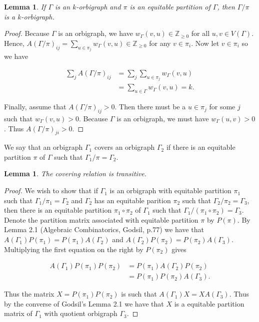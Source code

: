 \documentclass[12pt]{article}
\theoremstyle{plain}
\newtheorem{lemma}[theorem]{Lemma}
\theoremstyle{definition}
\theoremstyle{remark}
\begin{document}
    \begin{lemma}\label{lemma:EqPartitionQuotient}
      If $\Gamma$ is an $k$-orbigraph and $\pi$ is an equitable partition of $\Gamma$, then $\Gamma / \pi$ is a $k$-orbigraph.
    \end{lemma}
    \begin{proof}
      Because $\Gamma$ is an orbigraph, we have $w_\Gamma(v, u) \in \mathbb{Z}_{\ge 0}$ for all $u, v \in V(\Gamma)$. Hence, $A(\Gamma / \pi)_{ij} = \sum_{u \in \pi_j} w_\Gamma(v, u) \in \mathbb{Z}_{\ge 0}$ for any $v \in \pi_i$. Now let $v \in \pi_i$ so we have
      
      \begin{align*}
        \sum_j A(\Gamma / \pi)_{ij} &= \sum_j \sum_{u \in \pi_j} w_\Gamma(v, u) \\
        &= \sum_{u \in \Gamma} w_\Gamma(v, u) = k.
      \end{align*}

      Finally, assume that $A(\Gamma / \pi)_{ij} > 0$. Then there must be a $u \in \pi_j$ for some $j$ such that $w_\Gamma(v, u) > 0$. Because $\Gamma$ is an orbigraph, we must have $w_\Gamma(u, v) > 0$. Thus $A(\Gamma / \pi)_{ji} > 0$.
    \end{proof}

    We say that an orbigraph $\Gamma_1$ covers an orbigraph $\Gamma_2$ if there is an equitable partition $\pi$ of $\Gamma$ such that $\Gamma_1 / \pi = \Gamma_2$.

    \begin{lemma}\label{lemma:CoveringTransitivity}
      The covering relation is transitive.
    \end{lemma}
    \begin{proof}
      We wish to show that if $\Gamma_1$ is an orbigraph with equitable partition $\pi_1$ such that $\Gamma_1 / \pi_1 = \Gamma_2$ and $\Gamma_2$ has an equitable parition $\pi_2$ such that $\Gamma_2 / \pi_2 = \Gamma_3$, then there is an equitable partition $\pi_1 \circ \pi_2$ of $\Gamma_1$ such that $\Gamma_1 / (\pi_1 \circ \pi_2) = \Gamma_3$. Denote the partition matrix associated with equitable partition $\pi$ by $P(\pi)$. By Lemma 2.1 (Algebraic Combinatorics, Godsil, p.77) we have that $A(\Gamma_1)P(\pi_1) = P(\pi_1)A(\Gamma_2)$ and $A(\Gamma_2)P(\pi_2) = P(\pi_2)A(\Gamma_3)$. Multiplying the first equation on the right by $P(\pi_2)$ gives
      
      \begin{align*}
        A(\Gamma_1)P(\pi_1)P(\pi_2) &= P(\pi_1)A(\Gamma_2)P(\pi_2) \\
        &= P(\pi_1)P(\pi_2)A(\Gamma_3).
      \end{align*}

      Thus the matrix $X = P(\pi_1)P(\pi_2)$ is such that $A(\Gamma_1) X = X A(\Gamma_3)$. Thus by the converse of Godsil's Lemma 2.1 we have that $X$ is a equitable partition matrix of $\Gamma_1$ with quotient orbigraph $\Gamma_3$.
    \end{proof}
\end{document}
